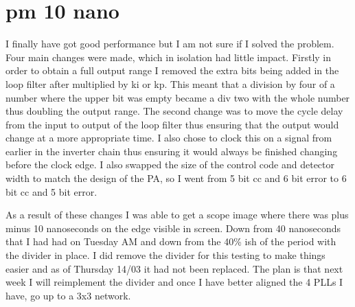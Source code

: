 \documentclass[a4paper,12pt]{report}
\begin{document}
\section{pm 10 nano}
I finally have got good performance but I am not sure if I solved the problem. Four main changes were made, which in isolation had little impact. Firstly in order to obtain a full output range I removed the extra bits being added in the loop filter after multiplied by ki or kp. This meant that a division by four of a number where the upper bit was empty became a div two with the whole number thus doubling the output range. The second change was to move the cycle delay from the input to output of the loop filter thus ensuring that the output would change at a more appropriate time. I also chose to clock this on a signal from earlier in the inverter chain thus ensuring it would always be finished changing before the clock edge. I also swapped the size of the control code and detector width to match the design of the PA, so I went from 5 bit cc and 6 bit error to 6 bit cc and 5 bit error.

As a result of these changes I was able to get a scope image where there was plus minus 10 nanoseconds on the edge visible in screen. Down from 40 nanoseconds that I had had on Tuesday AM and down from the 40\% ish of the period with the divider in place. I did remove the divider for this testing to make things easier and as of Thursday 14/03 it had not been replaced. The plan is that next week I will reimplement the divider and once I have better aligned the 4 PLLs I have, go up to a 3x3 network.
\end{document}
